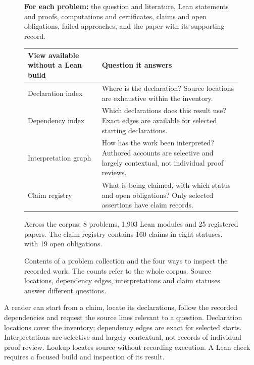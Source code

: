 \documentclass[10pt]{article}
\newcommand{\LeanModules}{1,903}
\newcommand{\Claims}{160}
\newcommand{\ClaimObligations}{19}
\newcommand{\ClaimStatuses}{eight}
\newcommand{\ProblemWorlds}{8}
\newcommand{\RegisteredPapers}{25}
\begin{document}
\begin{figure}[htbp]
\centering\small
\begin{minipage}{\linewidth}
\textbf{For each problem:} the question and literature, Lean statements and proofs,
computations and certificates, claims and open obligations, failed approaches,
and the paper with its supporting record.
\par\medskip
\begin{tabularx}{\linewidth}{@{}>{\raggedright\arraybackslash}p{3.25cm}>{\raggedright\arraybackslash}X@{}}
\toprule
View available without a Lean build & Question it answers\\
\midrule
Declaration index & Where is the declaration? Source locations are exhaustive within the inventory.\\[3pt]
Dependency index & Which declarations does this result use? Exact edges are available for selected starting declarations.\\[3pt]
Interpretation graph & How has the work been interpreted? Authored accounts are selective and largely contextual, not individual proof reviews.\\[3pt]
Claim registry & What is being claimed, with which status and open obligations? Only selected assertions have claim records.\\
\bottomrule
\end{tabularx}
\par\medskip
Across the corpus: \ProblemWorlds{} problems, \LeanModules{} Lean modules and
\RegisteredPapers{} registered papers. The claim registry contains \Claims{}
claims in \ClaimStatuses{} statuses, with \ClaimObligations{} open obligations.
\end{minipage}
\caption{Contents of a problem collection and the four ways to inspect the recorded work. The counts refer to the whole corpus. Source locations, dependency edges, interpretations and claim statuses answer different questions.}
\label{fig:world}
\end{figure}

A reader can start from a claim, locate its declarations, follow the recorded dependencies and request the source lines relevant to a question.
Declaration locations cover the inventory; dependency edges are exact for selected starts. Interpretations are selective and largely contextual, not records of individual proof review.
Lookup locates source without recording execution. A Lean check requires a focused build and inspection of its result.
\FloatBarrier
\end{document}
